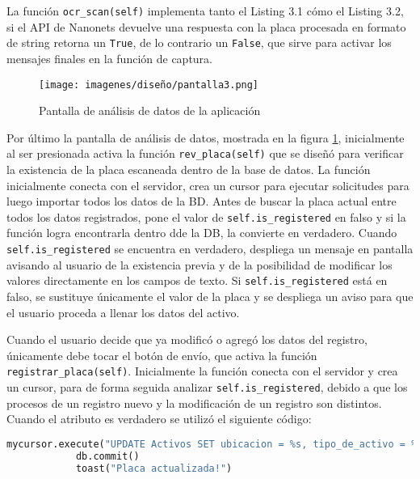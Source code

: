\par
La función \verb|ocr_scan(self)| implementa tanto el Listing 3.1 cómo el Listing 3.2, si el API de Nanonets devuelve una respuesta con la placa procesada en formato de string retorna un \verb|True|, de lo contrario un \verb|False|, que sirve para activar los mensajes finales en la función de captura.
\par
\begin{figure}[H]
    \centering
    \texttt{[image: imagenes/diseño/pantalla3.png]}
    \caption{Pantalla de análisis de datos de la aplicación}
    \label{screen3}
\end{figure}
Por último la pantalla de análisis de datos, mostrada en la figura \ref{screen3}, inicialmente al ser presionada activa la función \verb|rev_placa(self)| que se diseñó para verificar la existencia de la placa escaneada dentro de la base de datos. La función inicialmente conecta con el servidor, crea un cursor para ejecutar solicitudes para luego importar todos los datos de la BD. Antes de buscar la placa actual entre todos los datos registrados, pone el valor de \verb|self.is_registered| en falso y si la función logra encontrarla dentro dde la DB, la convierte en verdadero. Cuando \verb|self.is_registered| se encuentra en verdadero, despliega un mensaje en pantalla avisando al usuario de la existencia previa y de la posibilidad de modificar los valores directamente en los campos de texto. Si \verb|self.is_registered| está en falso, se sustituye únicamente el valor de la placa y se despliega un aviso para que el usuario proceda a llenar los datos del activo.
\par
Cuando el usuario decide que ya modificó o agregó los datos del registro, únicamente debe tocar el botón de envío, que activa la función \verb|registrar_placa(self)|. Inicialmente la función conecta con el servidor y crea un cursor, para de forma seguida analizar \verb|self.is_registered|, debido a que los procesos de un registro nuevo y la modificación de un registro son distintos. Cuando el atributo es verdadero se utilizó el siguiente código:
\newpage
\begin{lstlisting}[language=Python,frame=single,caption= Modificación de registro previamente existente (creación propia), inputencoding=latin1]
mycursor.execute("UPDATE Activos SET ubicacion = %s, tipo_de_activo = %s, descripcion = %s WHERE placa = %s", (self.root.ids.ubicacion.text, self.root.ids.active_type.text, self.root.ids.descrip.text, self.placa_actual))
            db.commit()
            toast("Placa actualizada!")
\end{lstlisting}
